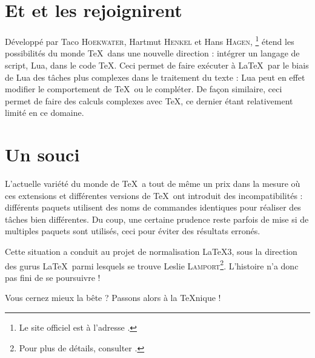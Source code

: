 \section{Et \LuaTeXtitre et \LuaLaTeXtitre les rejoignirent}

Développé par Taco \textsc{Hoekwater}, Hartmut \textsc{Henkel} et Hans \textsc{Hagen}, \LuaTeX\footnote{Le site officiel est à l'adresse .} étend les possibilités du monde \TeX\ dans une nouvelle direction : intégrer un langage de script, Lua, dans le code \TeX. Ceci permet de faire exécuter à \LaTeX\ par le biais de Lua des tâches plus complexes dans le traitement du texte : Lua peut en effet modifier le comportement de \TeX\ ou le compléter. De façon similaire, ceci permet de faire des calculs complexes avec \TeX, ce dernier étant relativement limité en ce domaine.

\section{Un souci}

L'actuelle variété du monde de \TeX\ a tout de même un prix dans la mesure où ces extensions et différentes versions de \TeX\ ont introduit des incompatibilités : différents paquets utilisent des noms de commandes identiques pour réaliser des tâches bien différentes. Du coup, une certaine prudence reste parfois de mise si de multiples paquets sont utilisés, ceci pour éviter des résultats erronés. 

Cette situation a conduit au projet de normalisation \LaTeX3, sous la direction des \og gurus \fg{} \LaTeX\ parmi lesquels se trouve Leslie \textsc{Lamport}\footnote{Pour plus de détails, consulter .}. L'histoire n'a donc pas fini de se poursuivre !


\begin{flushright}
Vous cernez mieux la bête ? Passons alors à la \TeX nique !
\end{flushright}